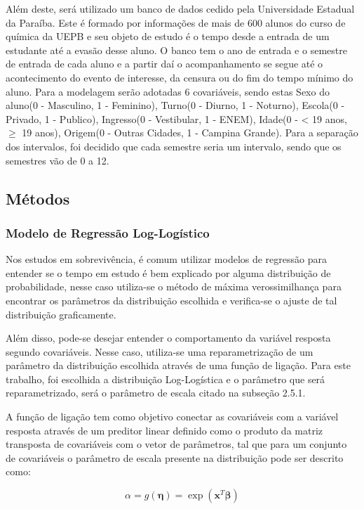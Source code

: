 \documentclass[a4paper,12pt]{article}
\begin{document}
Além deste, será utilizado um banco de dados cedido pela Universidade Estadual da Paraíba. Este é formado por informações de mais de 600 alunos do curso de química da UEPB e seu objeto de estudo é o tempo desde a entrada de um estudante até a evasão desse aluno. O banco tem o ano de entrada e o semestre de entrada de cada aluno e a partir daí o acompanhamento se segue até o acontecimento do evento de interesse, da censura ou do fim do tempo mínimo do aluno. Para a modelagem serão adotadas 6 covariáveis, sendo estas Sexo do aluno(0 - Masculino, 1 - Feminino), Turno(0 - Diurno, 1 - Noturno), Escola(0 - Privado, 1 - Publico), Ingresso(0 - Vestibular, 1 - ENEM), Idade(0 - < 19 anos, $\ge$ 19 anos), Origem(0 - Outras Cidades, 1 - Campina Grande). Para a separação dos intervalos, foi decidido que cada semestre seria um intervalo, sendo que os semestres vão de 0 a 12.

\subsection{Métodos}

\subsubsection{Modelo de Regressão Log-Logístico}

Nos estudos em sobrevivência, é comum utilizar modelos de regressão para entender se o tempo em estudo é bem explicado por alguma distribuição de probabilidade, nesse caso utiliza-se o método de máxima verossimilhança para encontrar os parâmetros da distribuição escolhida e verifica-se o ajuste de tal distribuição graficamente.

Além disso, pode-se desejar entender o comportamento da variável resposta segundo covariáveis. Nesse caso, utiliza-se uma reparametrização de um parâmetro da distribuição escolhida através de uma função de ligação. Para este trabalho, foi escolhida a distribuição Log-Logística e o parâmetro que será reparametrizado, será o parâmetro de escala citado na subseção 2.5.1.

A função de ligação tem como objetivo conectar as covariáveis com a variável resposta através de um preditor linear definido como o produto da matriz transposta de covariáveis com o vetor de parâmetros, tal que para um conjunto de covariáveis o parâmetro de escala presente na distribuição pode ser descrito como:

\begin{equation} \label{eq:lig}
  \alpha = g(\boldsymbol{\eta}) = \exp(\boldsymbol{x}^T\boldsymbol{\beta})
\end{equation}
\end{document}
